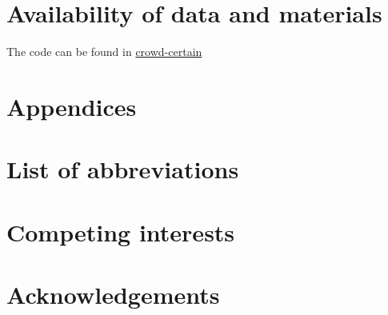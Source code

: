 \documentclass[pdflatex,bst/sn-basic]{bst/sn-jnl}%
\begin{document}
\section{Availability of data and materials}
The code can be found in \href{http://github.com/artinmajdi/crowdcertain}{crowd-certain}

\section{Appendices}
\section*{List of abbreviations}
\section*{Competing interests}
\section*{Acknowledgements}

% 

% 

\end{document}
